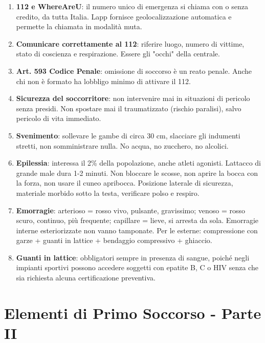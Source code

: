 \documentclass[a4paper,11pt]{article}
\begin{document}
\begin{enumerate}
      \item
            \textbf{112 e WhereAreU}: il numero unico di emergenza si chiama con o
            senza credito, da tutta Italia. L\textquotesingle app fornisce
            geolocalizzazione automatica e permette la chiamata in modalità muta.
      \item
            \textbf{Comunicare correttamente al 112}: riferire luogo, numero di
            vittime, stato di coscienza e respirazione. Essere gli "occhi" della
            centrale.
      \item
            \textbf{Art. 593 Codice Penale}: omissione di soccorso è un reato
            penale. Anche chi non è formato ha l\textquotesingle obbligo minimo di
            attivare il 112.
      \item
            \textbf{Sicurezza del soccorritore}: non intervenire mai in situazioni
            di pericolo senza presidi. Non spostare mai il traumatizzato (rischio
            paralisi), salvo pericolo di vita immediato.
      \item
            \textbf{Svenimento}: sollevare le gambe di circa 30 cm, slacciare gli
            indumenti stretti, non somministrare nulla. No acqua, no zucchero, no
            alcolici.
      \item
            \textbf{Epilessia}: interessa il 2\% della popolazione, anche atleti
            agonisti. L\textquotesingle attacco di grande male dura 1-2 minuti.
            Non bloccare le scosse, non aprire la bocca con la forza, non usare il
            cuneo apribocca. Posizione laterale di sicurezza, materiale morbido
            sotto la testa, verificare polso e respiro.
      \item
            \textbf{Emorragie}: arterioso = rosso vivo, pulsante, gravissimo;
            venoso = rosso scuro, continuo, più frequente; capillare = lieve, si
            arresta da sola. Emorragie interne esteriorizzate non vanno tamponate.
            Per le esterne: compressione con garze + guanti in lattice + bendaggio
            compressivo + ghiaccio.
      \item
            \textbf{Guanti in lattice}: obbligatori sempre in presenza di sangue,
            poiché negli impianti sportivi possono accedere soggetti con epatite
            B, C o HIV senza che sia richiesta alcuna certificazione preventiva.
\end{enumerate}

\section{Elementi di Primo Soccorso - Parte
  II}\label{elementi-di-primo-soccorso---parte-ii}
\end{document}
